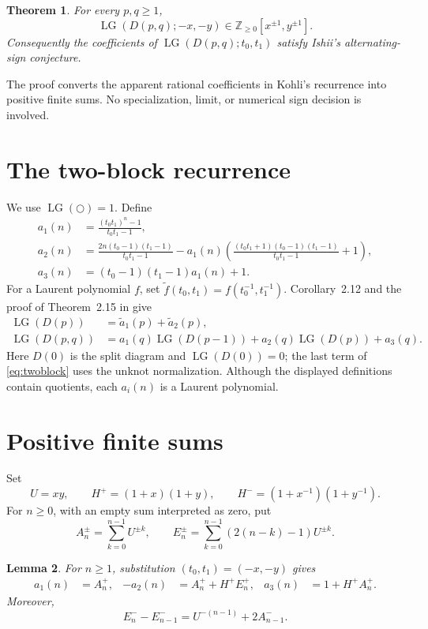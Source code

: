 \documentclass[11pt]{amsart}
\newtheorem{theorem}{Theorem}[section]
\newtheorem{lemma}[theorem]{Lemma}
\theoremstyle{remark}
\newcommand{\LG}{\operatorname{LG}}
\newcommand{\Z}{\mathbb Z}
\begin{document}
\begin{theorem}\label{thm:main}
For every $p,q\geq1$,
\[
  \LG(D(p,q);-x,-y)\in\Z_{\geq0}[x^{\pm1},y^{\pm1}].
\]
Consequently the coefficients of $\LG(D(p,q);t_0,t_1)$ satisfy Ishii's
alternating-sign conjecture.
\end{theorem}

The proof converts the apparent rational coefficients in Kohli's recurrence
into positive finite sums.  No specialization, limit, or numerical sign
decision is involved.

\section{The two-block recurrence}

We use $\LG(\bigcirc)=1$.  Define
\begin{align*}
 a_1(n)&=\frac{(t_0t_1)^n-1}{t_0t_1-1},\\
 a_2(n)&=\frac{2n(t_0-1)(t_1-1)}{t_0t_1-1}
 -a_1(n)\left(
 \frac{(t_0t_1+1)(t_0-1)(t_1-1)}{t_0t_1-1}+1\right),\\
 a_3(n)&=(t_0-1)(t_1-1)a_1(n)+1.
\end{align*}
For a Laurent polynomial $f$, set
$\widetilde f(t_0,t_1)=f(t_0^{-1},t_1^{-1})$.  Corollary~2.12 and the proof
of Theorem~2.15 in \cite{Kohli2018} give
\begin{align}
 \LG(D(p))&=\widetilde a_1(p)+\widetilde a_2(p),
 \label{eq:oneblock}\\
 \LG(D(p,q))&=a_1(q)\LG(D(p-1))
 +a_2(q)\LG(D(p))+a_3(q).                 \label{eq:twoblock}
\end{align}
Here $D(0)$ is the split diagram and $\LG(D(0))=0$; the last term of
\eqref{eq:twoblock} uses the unknot normalization.  Although the displayed
definitions contain quotients, each $a_i(n)$ is a Laurent polynomial.

\section{Positive finite sums}

Set
\[
 U=xy,\qquad H^+=(1+x)(1+y),\qquad
 H^-=(1+x^{-1})(1+y^{-1}).
\]
For $n\geq0$, with an empty sum interpreted as zero, put
\[
 A_n^\pm=\sum_{k=0}^{n-1}U^{\pm k},\qquad
 E_n^\pm=\sum_{k=0}^{n-1}(2(n-k)-1)U^{\pm k}.
\]

\begin{lemma}\label{lem:sums}
For $n\geq1$, substitution $(t_0,t_1)=(-x,-y)$ gives
\begin{align}
 a_1(n)&=A_n^+,&
 -a_2(n)&=A_n^++H^+E_n^+,&
 a_3(n)&=1+H^+A_n^+ .                    \label{eq:ai-positive}
\end{align}
Moreover,
\begin{equation}
 E_n^--E_{n-1}^-=U^{-(n-1)}+2A_{n-1}^- .
 \label{eq:E-difference}
\end{equation}
\end{lemma}
\end{document}
